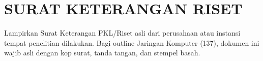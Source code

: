 \clearpage
\chapter*{SURAT KETERANGAN RISET}
\label{lamp:keterangan-riset}

Lampirkan Surat Keterangan PKL/Riset asli dari perusahaan atau instansi tempat penelitian dilakukan. Bagi outline Jaringan Komputer (137), dokumen ini wajib asli dengan kop surat, tanda tangan, dan stempel basah.

\begin{center}
\end{center}
